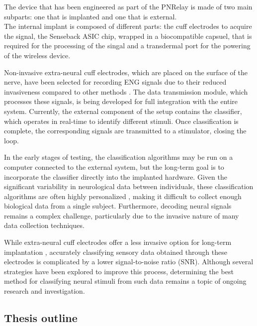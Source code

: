 \documentclass{Configuration_Files/PoliMi3i_thesis}
\begin{document}
The device that has been engineered as part of the PNRelay is made of two main subparts:
one that is implanted and one that is external.
\\
The internal implant is composed of different parts: the cuff electrodes to acquire the signal, the Senseback ASIC chip, wrapped in a biocompatible capsuel, that is required for the processing of the singal and a transdermal port for the powering of the wireless device.


Non-invasive extra-neural cuff electrodes, which are placed on the surface of the nerve, have been selected for recording ENG signals due to their reduced invasiveness compared to other methods \cite{tesiDavide20}. The data transmission module, which processes these signals, is being developed for full integration with the entire system. Currently, the external component of the setup contains the classifier, which operates in real-time to identify different stimuli. Once classification is complete, the corresponding signals are transmitted to a stimulator, closing the loop.

In the early stages of testing, the classification algorithms may be run on a computer connected to the external system, but the long-term goal is to incorporate the classifier directly into the implanted hardware. Given the significant variability in neurological data between individuals, these classification algorithms are often highly personalized \cite{tesiDavide3}, making it difficult to collect enough biological data from a single subject. Furthermore, decoding neural signals remains a complex challenge, particularly due to the invasive nature of many data collection techniques.

While extra-neural cuff electrodes offer a less invasive option for long-term implantation \cite{tesiDavide21}, accurately classifying sensory data obtained through these electrodes is complicated by a lower signal-to-noise ratio (SNR). Although several strategies have been explored to improve this process, determining the best method for classifying neural stimuli from such data remains a topic of ongoing research and investigation. \cite{tesiDavide3}\cite{tesiDavide20}\cite{tesiDavide21} \cite{tesiDavide}

\subsection{Thesis outline}
\end{document}
